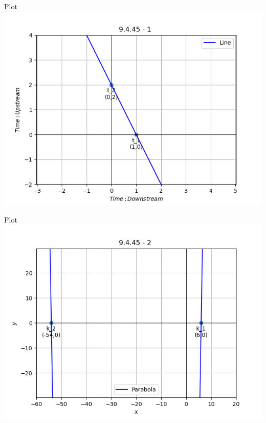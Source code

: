 \documentclass{beamer}
\begin{document}
 \begin{frame}{Plot}
    \centering
    \includegraphics[width=\columnwidth, height=0.8\textheight, keepaspectratio]{../figs/graph1_1.png}   
\end{frame}
 \begin{frame}{Plot}
    \centering
    \includegraphics[width=\columnwidth, height=0.8\textheight, keepaspectratio]{../figs/graph1_2.png}   
\end{frame}
\end{document}
